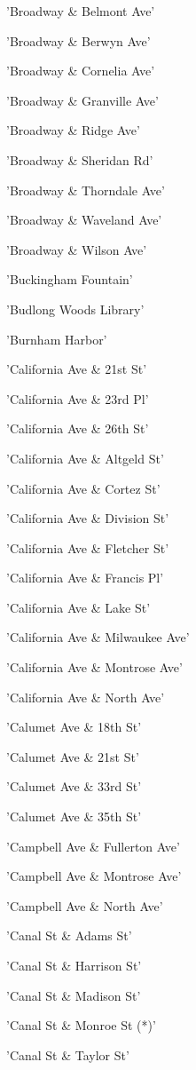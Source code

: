 \documentclass[11pt]{article}
\begin{document}
\begin{enumerate*}
\item 'Broadway \& Belmont Ave'
\item 'Broadway \& Berwyn Ave'
\item 'Broadway \& Cornelia Ave'
\item 'Broadway \& Granville Ave'
\item 'Broadway \& Ridge Ave'
\item 'Broadway \& Sheridan Rd'
\item 'Broadway \& Thorndale Ave'
\item 'Broadway \& Waveland Ave'
\item 'Broadway \& Wilson Ave'
\item 'Buckingham Fountain'
\item 'Budlong Woods Library'
\item 'Burnham Harbor'
\item 'California Ave \& 21st St'
\item 'California Ave \& 23rd Pl'
\item 'California Ave \& 26th St'
\item 'California Ave \& Altgeld St'
\item 'California Ave \& Cortez St'
\item 'California Ave \& Division St'
\item 'California Ave \& Fletcher St'
\item 'California Ave \& Francis Pl'
\item 'California Ave \& Lake St'
\item 'California Ave \& Milwaukee Ave'
\item 'California Ave \& Montrose Ave'
\item 'California Ave \& North Ave'
\item 'Calumet Ave \& 18th St'
\item 'Calumet Ave \& 21st St'
\item 'Calumet Ave \& 33rd St'
\item 'Calumet Ave \& 35th St'
\item 'Campbell Ave \& Fullerton Ave'
\item 'Campbell Ave \& Montrose Ave'
\item 'Campbell Ave \& North Ave'
\item 'Canal St \& Adams St'
\item 'Canal St \& Harrison St'
\item 'Canal St \& Madison St'
\item 'Canal St \& Monroe St (*)'
\item 'Canal St \& Taylor St'

\end{enumerate*}
\end{document}
